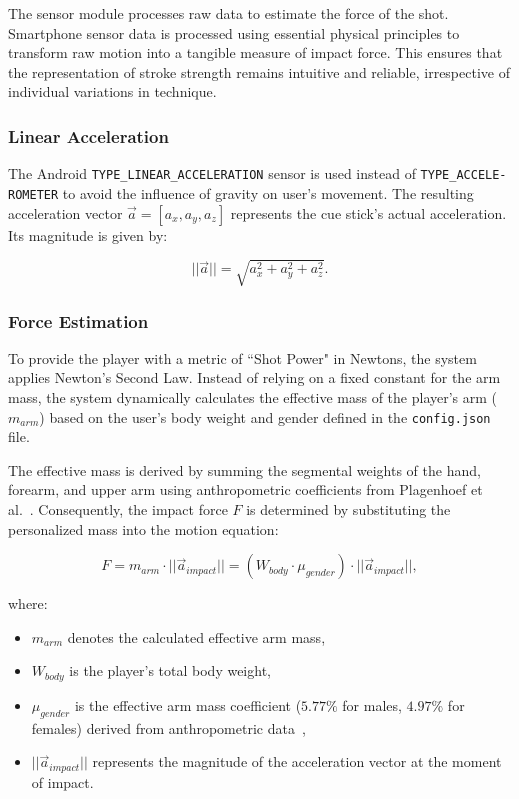 The sensor module processes raw data to estimate the force of the shot. Smartphone sensor data is processed using essential physical principles to transform raw motion into a tangible measure of impact force. This ensures that the representation of stroke strength remains intuitive and reliable, irrespective of individual variations in technique.

\subsubsection{Linear Acceleration}

The Android \texttt{TYPE\_LINEAR\_ACCELERATION} sensor is used instead of \texttt{TYPE\_ACCELE-}\allowbreak\texttt{ROMETER} to avoid the influence of gravity on user's movement. The resulting acceleration vector $\vec{a} = [a_x, a_y, a_z]$ represents the cue stick's actual acceleration. Its magnitude is given by:

\begin{equation}
    ||\vec{a}|| = \sqrt{a_x^2 + a_y^2 + a_z^2}.
\end{equation}

\subsubsection{Force Estimation}
To provide the player with a metric of ``Shot Power" in Newtons, the system applies Newton's Second Law. Instead of relying on a fixed constant for the arm mass, the system dynamically calculates the effective mass of the player's arm ($m_{arm}$) based on the user's body weight and gender defined in the \texttt{config.json} file.

The effective mass is derived by summing the segmental weights of the hand, forearm, and upper arm using anthropometric coefficients from Plagenhoef et al.~\cite{bib:anatomical}. Consequently, the impact force $F$ is determined by substituting the personalized mass into the motion equation:

\begin{equation}
    F = m_{arm} \cdot ||\vec{a}_{impact}|| = (W_{body} \cdot \mu_{gender}) \cdot ||\vec{a}_{impact}||,
\end{equation}

\noindent where:
\begin{itemize}
    \item $m_{arm}$ denotes the calculated effective arm mass,
    \item $W_{body}$ is the player's total body weight,
    \item $\mu_{gender}$ is the effective arm mass coefficient ($5.77\%$ for males, $4.97\%$ for females) derived from anthropometric data~\cite{bib:anatomical},
    \item $||\vec{a}_{impact}||$ represents the magnitude of the acceleration vector at the moment of impact.
\end{itemize}

